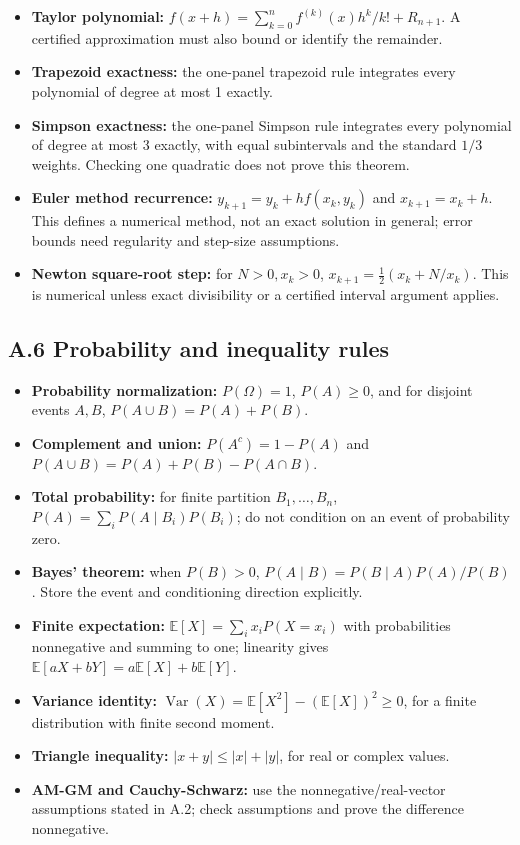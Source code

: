 \documentclass[
  10pt,
]{article}
\providecommand{\tightlist}{%
  \setlength{\itemsep}{0pt}\setlength{\parskip}{0pt}}
\begin{document}
\begin{itemize}
\item
  \textbf{Taylor polynomial:}
  \(f(x+h)=\sum_{k=0}^{n}f^{(k)}(x)h^k/k!+R_{n+1}\). A certified
  approximation must also bound or identify the remainder.
\item
  \textbf{Trapezoid exactness:} the one-panel trapezoid rule integrates
  every polynomial of degree at most 1 exactly.
\item
  \textbf{Simpson exactness:} the one-panel Simpson rule integrates
  every polynomial of degree at most 3 exactly, with equal subintervals
  and the standard \(1/3\) weights. Checking one quadratic does not
  prove this theorem.
\item
  \textbf{Euler method recurrence:} \(y_{k+1}=y_k+h f(x_k,y_k)\) and
  \(x_{k+1}=x_k+h\). This defines a numerical method, not an exact
  solution in general; error bounds need regularity and step-size
  assumptions.
\item
  \textbf{Newton square-root step:} for \(N>0,x_k>0\),
  \(x_{k+1}=\tfrac12(x_k+N/x_k)\). This is numerical unless exact
  divisibility or a certified interval argument applies.
\end{itemize}

\subsection{A.6 Probability and inequality
rules}\label{a.6-probability-and-inequality-rules}

\begin{itemize}
\tightlist
\item
  \textbf{Probability normalization:} \(P(\Omega)=1\), \(P(A)\ge0\), and
  for disjoint events \(A,B\), \(P(A\cup B)=P(A)+P(B)\).
\item
  \textbf{Complement and union:} \(P(A^c)=1-P(A)\) and
  \(P(A\cup B)=P(A)+P(B)-P(A\cap B)\).
\item
  \textbf{Total probability:} for finite partition \(B_1,\ldots,B_n\),
  \(P(A)=\sum_iP(A\mid B_i)P(B_i)\); do not condition on an event of
  probability zero.
\item
  \textbf{Bayes' theorem:} when \(P(B)>0\),
  \(P(A\mid B)=P(B\mid A)P(A)/P(B)\). Store the event and conditioning
  direction explicitly.
\item
  \textbf{Finite expectation:} \(\mathbb E[X]=\sum_i x_iP(X=x_i)\) with
  probabilities nonnegative and summing to one; linearity gives
  \(\mathbb E[aX+bY]=a\mathbb E[X]+b\mathbb E[Y]\).
\item
  \textbf{Variance identity:}
  \(\operatorname{Var}(X)=\mathbb E[X^2]-(\mathbb E[X])^2\ge0\), for a
  finite distribution with finite second moment.
\item
  \textbf{Triangle inequality:} \(|x+y|\le|x|+|y|\), for real or complex
  values.
\item
  \textbf{AM-GM and Cauchy-Schwarz:} use the nonnegative/real-vector
  assumptions stated in A.2; check assumptions and prove the difference
  nonnegative.
\end{itemize}
\end{document}
